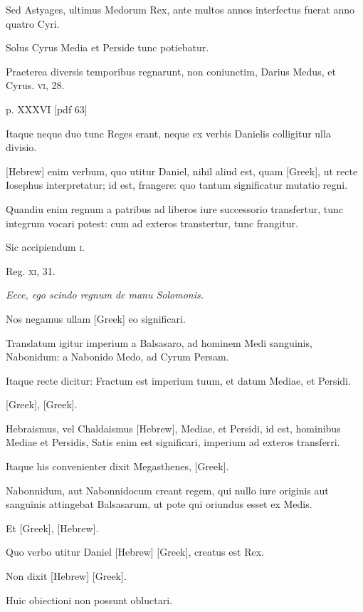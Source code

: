 \begin{parnumbers}
Sed Astyages, ultimus Medorum Rex, ante multos
annos interfectus fuerat anno quatro Cyri.

Solus Cyrus Media et
Perside tunc potiebatur.

Praeterea diversis temporibus regnarunt,
non coniunctim, Darius Medus, et Cyrus. \textsc{vi}, 28.

\clearpage
p. XXXVI [pdf 63]

Itaque neque
duo tunc Reges erant, neque ex verbis Danielis colligitur ulla divisio.

\texthebrew{[Hebrew]} enim verbum, quo utitur Daniel, nihil aliud est, quam
\textgreek{[Greek]}, ut recte Iosephus interpretatur;
 id est, frangere: quo tantum
significatur mutatio regni.

Quandiu enim regnum a patribus
ad liberos iure successorio transfertur, tunc integrum vocari potest:
cum ad exteros transtertur, tunc frangitur.

Sic accipiendum \textsc{i}.

Reg. \textsc{xi}, 31.

\textit{Ecce, ego scindo regnum  de manu Solomonis.}

Nos negamus ullam \textgreek{[Greek]} eo significari.

Translatum igitur imperium
a Balsasaro, ad hominem Medi sanguinis, Nabonidum: a Nabonido
Medo, ad Cyrum Persam.

Itaque recte dicitur: Fractum est
imperium tuum, et datum Mediae, et Persidi.

\textgreek{[Greek]},
\textgreek{[Greek]}.

Hebraismus, vel Chaldaismus
\texthebrew{[Hebrew]}, Mediae, et Persidi, id est, hominibus Mediae et Persidis,
Satis enim est significari, imperium ad exteros transferri.

Itaque his convenienter
dixit Megasthenes, \textgreek{[Greek]}.

Nabonnidum, aut Nabonnidocum creant regem, qui
nullo iure originis aut sanguinis attingebat Balsasarum, ut pote qui
oriundus esset ex Medis.

Et \textgreek{[Greek]}, \texthebrew{[Hebrew]}.

Quo verbo utitur
Daniel \texthebrew{[Hebrew]} \textgreek{[Greek]}, creatus est Rex.

Non dixit \texthebrew{[Hebrew]} \textgreek{[Greek]}.

Huic obiectioni non possunt obluctari.


\end{parnumbers}
